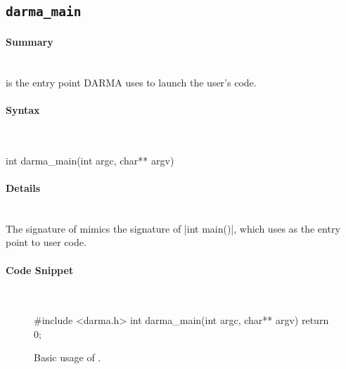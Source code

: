 


\subsection{\texttt{darma\_main}}

\paragraph{Summary}\mbox{}\\
is the entry point \gls{DARMA} uses to launch the user's code.

\paragraph{Syntax}\mbox{}\\
\begin{CppCode}
int darma_main(int argc, char** argv)
\end{CppCode}

\paragraph{Details}\mbox{}\\
The signature of  mimics the signature of |int main()|,
which \CC{} uses as the entry point to user code.

\paragraph{Code Snippet}\mbox{}\\ 
\begin{figure}[!h]
\begin{CppCodeNumb}
#include <darma.h>
int darma_main(int argc, char** argv)
{
  return 0;
}
\end{CppCodeNumb}
\label{fig:fe_api_main}
  \caption{Basic usage of \protect{}.}
\end{figure}


